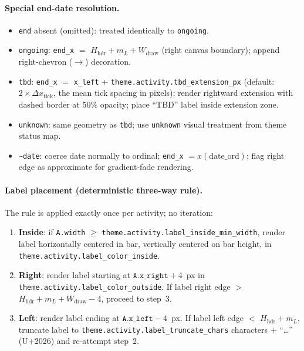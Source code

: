 \paragraph{Special end-date resolution.}
\begin{itemize}
  \item \texttt{end} absent (omitted): treated identically to \texttt{ongoing}.
  \item \texttt{ongoing}: \texttt{end\_x} $=$ $H_{\mathrm{hdr}} + m_L + W_{\mathrm{draw}}$
        (right canvas boundary); append right-chevron ($\rightarrow$) decoration.
  \item \texttt{tbd}: \texttt{end\_x} $=$ \texttt{x\_left} $+$
        \texttt{theme.activity.tbd\_extension\_px}
        (default: $2 \times \overline{\Delta x_{\text{tick}}}$, the mean tick spacing in pixels);
        render rightward extension with dashed border at 50\% opacity;
        place ``TBD'' label inside extension zone.
  \item \texttt{unknown}: same geometry as \texttt{tbd}; use \texttt{unknown} visual
        treatment from theme status map.
  \item \texttt{\textasciitilde{}date}: coerce date normally to ordinal; \texttt{end\_x}
        $= x(\text{date\_ord})$; flag right edge as approximate for gradient-fade rendering.
\end{itemize}

\paragraph{Label placement (deterministic three-way rule).}
The rule is applied exactly once per activity; no iteration:
\begin{enumerate}
  \item \textbf{Inside}: if \texttt{A.width} $\geq$ \texttt{theme.activity.label\_inside\_min\_width},
        render label horizontally centered in bar, vertically centered on bar height, in
        \texttt{theme.activity.label\_color\_inside}.
  \item \textbf{Right}: render label starting at $\texttt{A.x\_right} + 4$~px in
        \texttt{theme.activity.label\_color\_outside}.
        If label right edge $>$ $H_{\mathrm{hdr}} + m_L + W_{\mathrm{draw}} - 4$, proceed to
        step~3.
  \item \textbf{Left}: render label ending at $\texttt{A.x\_left} - 4$~px.
        If label left edge $<$ $H_{\mathrm{hdr}} + m_L$, truncate label to
        \texttt{theme.activity.label\_truncate\_chars} characters $+$
        ``\ldots'' (U+2026) and re-attempt step~2.
\end{enumerate}

